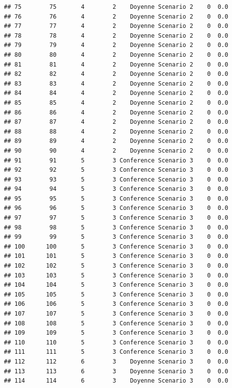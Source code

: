 \documentclass[
]{article}
\begin{document}
\begin{verbatim}
## 75        75       4        2    Doyenne Scenario 2    0  0.0
## 76        76       4        2    Doyenne Scenario 2    0  0.0
## 77        77       4        2    Doyenne Scenario 2    0  0.0
## 78        78       4        2    Doyenne Scenario 2    0  0.0
## 79        79       4        2    Doyenne Scenario 2    0  0.0
## 80        80       4        2    Doyenne Scenario 2    0  0.0
## 81        81       4        2    Doyenne Scenario 2    0  0.0
## 82        82       4        2    Doyenne Scenario 2    0  0.0
## 83        83       4        2    Doyenne Scenario 2    0  0.0
## 84        84       4        2    Doyenne Scenario 2    0  0.0
## 85        85       4        2    Doyenne Scenario 2    0  0.0
## 86        86       4        2    Doyenne Scenario 2    0  0.0
## 87        87       4        2    Doyenne Scenario 2    0  0.0
## 88        88       4        2    Doyenne Scenario 2    0  0.0
## 89        89       4        2    Doyenne Scenario 2    0  0.0
## 90        90       4        2    Doyenne Scenario 2    0  0.0
## 91        91       5        3 Conference Scenario 3    0  0.0
## 92        92       5        3 Conference Scenario 3    0  0.0
## 93        93       5        3 Conference Scenario 3    0  0.0
## 94        94       5        3 Conference Scenario 3    0  0.0
## 95        95       5        3 Conference Scenario 3    0  0.0
## 96        96       5        3 Conference Scenario 3    0  0.0
## 97        97       5        3 Conference Scenario 3    0  0.0
## 98        98       5        3 Conference Scenario 3    0  0.0
## 99        99       5        3 Conference Scenario 3    0  0.0
## 100      100       5        3 Conference Scenario 3    0  0.0
## 101      101       5        3 Conference Scenario 3    0  0.0
## 102      102       5        3 Conference Scenario 3    0  0.0
## 103      103       5        3 Conference Scenario 3    0  0.0
## 104      104       5        3 Conference Scenario 3    0  0.0
## 105      105       5        3 Conference Scenario 3    0  0.0
## 106      106       5        3 Conference Scenario 3    0  0.0
## 107      107       5        3 Conference Scenario 3    0  0.0
## 108      108       5        3 Conference Scenario 3    0  0.0
## 109      109       5        3 Conference Scenario 3    0  0.0
## 110      110       5        3 Conference Scenario 3    0  0.0
## 111      111       5        3 Conference Scenario 3    0  0.0
## 112      112       6        3    Doyenne Scenario 3    0  0.0
## 113      113       6        3    Doyenne Scenario 3    0  0.0
## 114      114       6        3    Doyenne Scenario 3    0  0.0

\end{verbatim}
\end{document}
